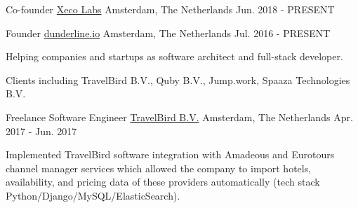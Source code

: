 

\begin{cventries}

  \cventry
    {Co-founder} %
    {\href{https://www.xecolabs.com}{Xeco Labs}} %
    {Amsterdam, The Netherlands} %
    {Jun. 2018 - PRESENT} %
    {}


  \cventry
    {Founder} %
    {\href{https://www.dunderline.io/}{dunderline.io}} %
    {Amsterdam, The Netherlands} %
    {Jul. 2016 - PRESENT} %
    {
      \begin{cvitems} %
        \item {Helping companies and startups as software architect and full-stack developer.}
        \item {Clients including TravelBird B.V., Quby B.V., Jump.work, Spaaza Technologies B.V.}
      \end{cvitems}
    }

  \cventry
    {Freelance Software Engineer} %
    {\href{https://travelbird.nl/}{TravelBird B.V.}} %
    {Amsterdam, The Netherlands} %
    {Apr. 2017 - 	Jun. 2017} %
    {
      \begin{cvitems} %
        \item {Implemented TravelBird software integration with Amadeous and Eurotours channel manager services which allowed the company to import hotels, availability, and pricing data of these providers automatically (tech stack Python/Django/MySQL/ElasticSearch).}
      \end{cvitems}
    }


\end{cventries}
